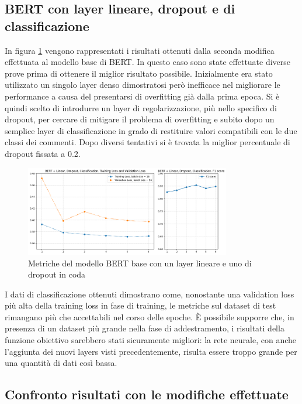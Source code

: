 \subsection{BERT con layer lineare, dropout e di classificazione}
    In figura \ref{fig:bert-linear} vengono rappresentati i risultati ottenuti dalla seconda modifica effettuata al modello base di BERT. In questo caso sono state effettuate diverse prove prima di ottenere il miglior risultato possibile. Inizialmente era stato utilizzato un singolo layer denso dimostratosi però inefficace nel migliorare le performance a causa del presentarsi di overfitting già dalla prima epoca. Si è quindi scelto di introdurre un layer di regolarizzazione, più nello specifico di dropout, per cercare di mitigare il problema di overfitting e subito dopo un semplice layer di classificazione in grado di restituire valori compatibili con le due classi dei commenti. Dopo diversi tentativi si è trovata la miglior percentuale di dropout fissata a 0.2. 
    
    \begin{figure}[h]
        \centering
        \includegraphics[width=0.8\textwidth]{pics/modifiche bert/BERT Linear.png}
        \caption{Metriche del modello BERT base con un layer lineare e uno di dropout in coda}
        \label{fig:bert-linear}
    \end{figure}
    
    I dati di classificazione ottenuti dimostrano come, nonostante una validation loss più alta della training loss in fase di training, le metriche sul dataset di test rimangano più che accettabili nel corso delle epoche. È possibile supporre che, in presenza di un dataset più grande nella fase di addestramento, i risultati della funzione obiettivo sarebbero stati sicuramente migliori: la rete neurale, con anche l'aggiunta dei nuovi layers visti precedentemente, risulta essere troppo grande per una quantità di dati così bassa.
    
\subsection{Confronto risultati con le modifiche effettuate}

